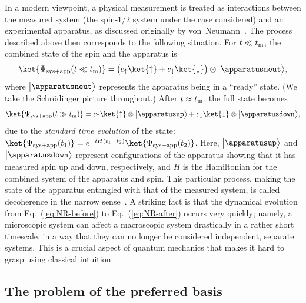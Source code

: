 \documentclass[12pt]{article}
\begin{document}
In a modern viewpoint, a physical measurement is treated as interactions 
between the measured system (the spin-$1/2$ system under the case 
considered) and an experimental apparatus, as discussed originally 
by von~Neumann~\cite{von_Neumann}.  The process described above then 
corresponds to the following situation.  For $t \ll t_{\rm m}$, the 
combined state of the spin and the apparatus is
%
\begin{equation}
  \ket{\Psi_{{\rm sys}+{\rm app}}(t \ll t_{\rm m})} 
  = \bigl( c_\uparrow \ket{\uparrow} + c_\downarrow \ket{\downarrow} \bigr) 
    \otimes \bigl|\apparatusneut\bigr>,
\label{eq:NR-before}
\end{equation}
%
where $\bigl|\apparatusneut\bigr>$ represents the apparatus being 
in a ``ready'' state.  (We take the Schr\"{o}dinger picture throughout.) 
After $t \approx t_{\rm m}$, the full state becomes
%
\begin{equation}
  \ket{\Psi_{{\rm sys}+{\rm app}}(t \gg t_{\rm m})} = 
    c_\uparrow \ket{\uparrow} \otimes \bigl|\apparatusup\bigr> 
    + c_\downarrow \ket{\downarrow} \otimes \bigl|\apparatusdown\bigr>,
\label{eq:NR-after}
\end{equation}
%
due to the {\it standard time evolution} of the state:\ 
$\ket{\Psi_{{\rm sys}+{\rm app}}(t_1)} = e^{-iH(t_1-t_2)} 
\ket{\Psi_{{\rm sys}+{\rm app}}(t_2)}$.  Here, $\bigl|\apparatusup\bigr>$ 
and $\bigl|\apparatusdown\bigr>$ represent configurations of the 
apparatus showing that it has measured spin up and down, respectively, 
and $H$ is the Hamiltonian for the combined system of the apparatus 
and spin.  This particular process, making the state of the apparatus 
entangled with that of the measured system, is called decoherence in the 
narrow sense~\cite{Schlosshauer}.  A striking fact is that the dynamical 
evolution from Eq.~(\ref{eq:NR-before}) to Eq.~(\ref{eq:NR-after}) 
occurs very quickly; namely, a microscopic system can affect a macroscopic 
system drastically in a rather short timescale, in a way that they can 
no longer be considered independent, separate systems.  This is a crucial 
aspect of quantum mechanics that makes it hard to grasp using classical 
intuition.


\subsection{The problem of the preferred basis}
\label{subsec:preferred-basis}
\end{document}

